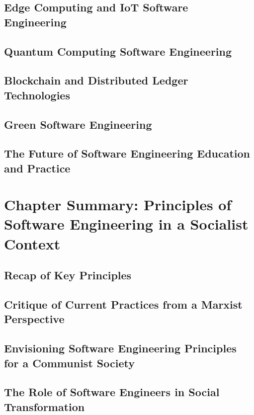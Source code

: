 \begin{refsection}
\subsection{Edge Computing and IoT Software Engineering}
\subsection{Quantum Computing Software Engineering}
\subsection{Blockchain and Distributed Ledger Technologies}
\subsection{Green Software Engineering}
\subsection{The Future of Software Engineering Education and Practice}

\newpage

\section{Chapter Summary: Principles of Software Engineering in a Socialist Context}
\subsection{Recap of Key Principles}
\subsection{Critique of Current Practices from a Marxist Perspective}
\subsection{Envisioning Software Engineering Principles for a Communist Society}
\subsection{The Role of Software Engineers in Social Transformation}

\printbibliography[heading=subbibliography]
\end{refsection}
